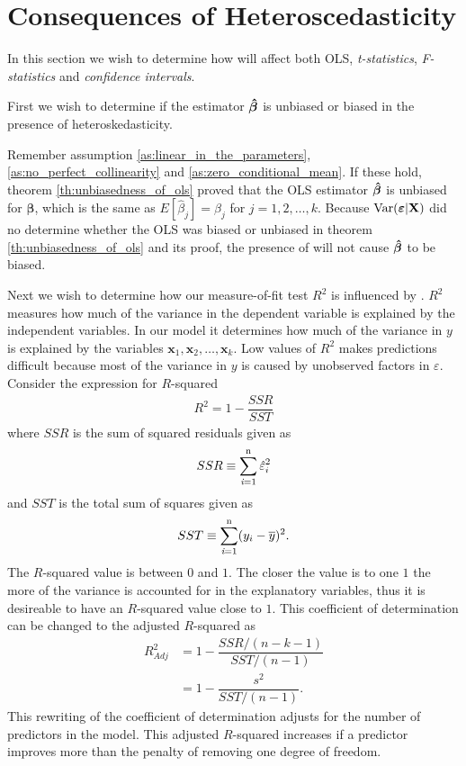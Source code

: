 \newpage
\section{Consequences of Heteroscedasticity}\label{sec:consequence_of_hetero}
In this section we wish to determine how \hetero will affect both OLS, \textit{t-statistics}, \textit{F-statistics} and \textit{confidence intervals}. 

First we wish to determine if the estimator $\operatorname{\boldsymbol{\hat{\beta}}}$ is unbiased or biased in the presence of heteroskedasticity.  

Remember assumption \ref{as:linear_in_the_parameters}, \ref{as:no_perfect_collinearity} and \ref{as:zero_conditional_mean}. If these hold, theorem \ref{th:unbiasedness_of_ols} proved that the OLS estimator $\operatorname{\boldsymbol{\hat{\beta}}}$ is unbiased for $\boldsymbol{\beta}$, which is the same as $E[\hat{\beta}_j] = \beta_j
$ for $j = 1,2, \ldots, k$. 
Because $\operatorname{\text{Var}}(\boldsymbol{\varepsilon} | \mathbf{X})$ did no determine whether the OLS was biased or unbiased in theorem \ref{th:unbiasedness_of_ols} and its proof, the presence of \hetero will not cause $\operatorname{\boldsymbol{\hat{\beta}}}$ to be biased. 

Next we wish to determine how our measure-of-fit test $R^2$ is influenced by \hetero. 
$R^2$ measures how much of the variance in the dependent variable is explained by the independent variables. In our model it determines how much of the variance in $y$ is explained by the variables $\mathbf{x}_1, \mathbf{x}_2, \ldots, \mathbf{x}_k$. 
Low values of $R^2$ makes predictions difficult because most of the variance in $y$ is caused by unobserved factors in $\varepsilon$.
Consider the expression for $R$-squared
\begin{align*}
    R^2 = 1 - \dfrac{SSR}{SST}
\end{align*}
where $SSR$ is the sum of squared residuals given as
\begin{align*}
    SSR \equiv \operatorname{\sum_{\textit{i}=1}^n} \hat{\varepsilon}_i^2
\end{align*}
and $SST$ is the total sum of squares given as
\begin{align*}
    SST \equiv \operatorname{\sum_{\textit{i}=1}^n} (y_i - \overline{y})^2. 
\end{align*}
The $R$-squared value is between $0$ and $1$. The closer the value is to one $1$ the more of the variance is accounted for in the explanatory variables, thus it is desireable to have an $R$-squared value close to $1$.
This coefficient of determination can be changed to the adjusted $R$-squared as
\begin{align*}
    R^2_{Adj} &= 1 - \dfrac{SSR/(n - k - 1)}{SST/(n - 1)}\\
      &= 1 - \dfrac{s^2}{SST/(n-1)}.
\end{align*}
This rewriting of the coefficient of determination adjusts for the number of predictors in the model. This adjusted $R$-squared increases if a predictor improves more than the penalty of removing one degree of freedom. 


